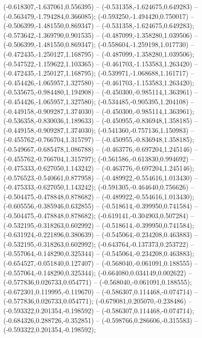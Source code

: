  (-0.618307,-1.637061,0.556395) -- (-0.531358,-1.624675,0.649283) -- (-0.563479,-1.794284,0.366085);
 (-0.593250,-1.494420,0.750017) -- (-0.506399,-1.481550,0.869347) -- (-0.531358,-1.624675,0.649283);
 (-0.573642,-1.369790,0.901535) -- (-0.487099,-1.358280,1.039506) -- (-0.506399,-1.481550,0.869347);
 (-0.558604,-1.259198,1.017730) -- (-0.472435,-1.250127,1.168795) -- (-0.487099,-1.358280,1.039506);
 (-0.547522,-1.159622,1.103365) -- (-0.461703,-1.153583,1.263420) -- (-0.472435,-1.250127,1.168795);
 (-0.539971,-1.068688,1.161717) -- (-0.454426,-1.065957,1.327580) -- (-0.461703,-1.153583,1.263420);
 (-0.535675,-0.984480,1.194908) -- (-0.450300,-0.985114,1.363961) -- (-0.454426,-1.065957,1.327580);
 (-0.534485,-0.905395,1.204108) -- (-0.449158,-0.909287,1.374030) -- (-0.450300,-0.985114,1.363961);
 (-0.536358,-0.830036,1.189633) -- (-0.450955,-0.836948,1.358185) -- (-0.449158,-0.909287,1.374030);
 (-0.541360,-0.757136,1.150983) -- (-0.455762,-0.766704,1.315797) -- (-0.450955,-0.836948,1.358185);
 (-0.549667,-0.685478,1.086788) -- (-0.463776,-0.697204,1.245146) -- (-0.455762,-0.766704,1.315797);
 (-0.561586,-0.613830,0.994692) -- (-0.475333,-0.627050,1.143242) -- (-0.463776,-0.697204,1.245146);
 (-0.576523,-0.540661,0.877958) -- (-0.489922,-0.554616,1.013430) -- (-0.475333,-0.627050,1.143242);
 (-0.591305,-0.464640,0.756626) -- (-0.504475,-0.478848,0.878682) -- (-0.489922,-0.554616,1.013430);
 (-0.605556,-0.385946,0.632855) -- (-0.518614,-0.399950,0.741584) -- (-0.504475,-0.478848,0.878682);
 (-0.619141,-0.304903,0.507284) -- (-0.532195,-0.318263,0.602992) -- (-0.518614,-0.399950,0.741584);
 (-0.631924,-0.221896,0.380639) -- (-0.545064,-0.234208,0.463883) -- (-0.532195,-0.318263,0.602992);
 (-0.643764,-0.137373,0.253722) -- (-0.557064,-0.148290,0.325344) -- (-0.545064,-0.234208,0.463883);
 (-0.654527,-0.051840,0.127407) -- (-0.568040,-0.061091,0.188555) -- (-0.557064,-0.148290,0.325344);
 (-0.664080,0.034149,0.002622) -- (-0.577836,0.026733,0.054771) -- (-0.568040,-0.061091,0.188555);
 (-0.672301,0.119995,-0.119670) -- (-0.586307,0.114468,-0.074714) -- (-0.577836,0.026733,0.054771);
 (-0.679081,0.205070,-0.238486) -- (-0.593322,0.201354,-0.198592) -- (-0.586307,0.114468,-0.074714);
 (-0.684326,0.288726,-0.352851) -- (-0.598766,0.286606,-0.315583) -- (-0.593322,0.201354,-0.198592);
